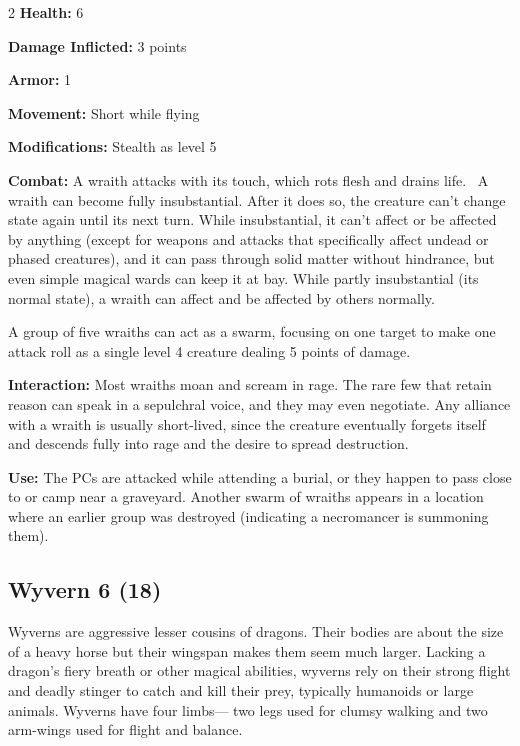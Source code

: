 \begin{multicols}{2}
\textbf{Health:} 6 

\textbf{Damage Inflicted:} 3 points 

\textbf{Armor:} 1 

\textbf{Movement:} Short while flying 

\textbf{Modifications:} Stealth as level 5 

\textbf{Combat:} A wraith attacks with its touch, which rots flesh and drains life. 
A wraith can become fully insubstantial. After it does so, the creature can’t change state again until its next turn. While insubstantial, it can’t affect or be affected by anything (except for weapons and attacks that specifically affect undead or phased creatures), and it can pass through solid matter without hindrance, but even simple magical wards can keep it at bay. While partly insubstantial (its normal state), a wraith can affect and be affected by others normally. 

A group of five wraiths can act as a swarm, focusing on one target to make one attack roll as a single level 4 creature dealing 5 points of damage. 

\textbf{Interaction:} Most wraiths moan and scream in rage. The rare few that retain reason can speak in a sepulchral voice, and they may even negotiate. Any alliance with a wraith is usually short-lived, since the creature eventually forgets itself and descends fully into rage and the desire to spread destruction. 

\textbf{Use:} The PCs are attacked while attending a burial, or they happen to pass close to or camp near a graveyard. Another swarm of wraiths appears in a location where an earlier group was destroyed (indicating a necromancer is summoning them).

\subsection{Wyvern 6 (18)}

Wyverns are aggressive lesser cousins of dragons. Their bodies are about the size of a heavy horse but their wingspan makes them seem much larger. Lacking a dragon’s fiery breath or other magical abilities, wyverns rely on their strong flight and deadly stinger to catch and kill their prey, typically humanoids or large animals. Wyverns have four limbs— two legs used for clumsy walking and two arm-wings used for flight and balance. 


\end{multicols}
